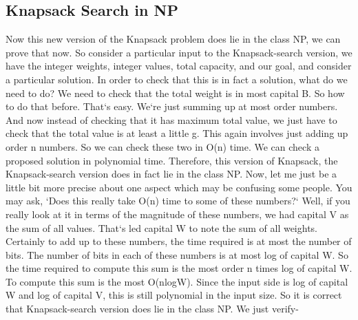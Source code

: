 \subsection{Knapsack Search in NP}
Now this new version of the Knapsack problem does lie in the class NP, we can prove that now.
So consider a particular input to the Knapsack-search version, we have the integer weights, integer values, total capacity, and our goal, and consider a particular solution.
In order to check that this is in fact a solution, what do we need to do? We need to check that the total weight is in most capital B\@.
So how to do that before.
That`s easy.
We`re just summing up at most order numbers.
And now instead of checking that it has maximum total value, we just have to check that the total value is at least a little g.
This again involves just adding up order n numbers.
So we can check these two in O(n) time.
We can check a proposed solution in polynomial time.
Therefore, this version of Knapsack, the Knapsack-search version does in fact lie in the class NP\@.
Now, let me just be a little bit more precise about one aspect which may be confusing some people.
You may ask, `Does this really take O(n) time to some of these numbers?` Well, if you really look at it in terms of the magnitude of these numbers, we had capital V as the sum of all values.
That`s led capital W to note the sum of all weights.
Certainly to add up to these numbers, the time required is at most the number of bits.
The number of bits in each of these numbers is at most log of capital W\@.
So the time required to compute this sum is the most order n times log of capital W\@.
To compute this sum is the most O(nlogW).
Since the input side is log of capital W and log of capital V, this is still polynomial in the input size.
So it is correct that Knapsack-search version does lie in the class NP\@.
We just verify-

